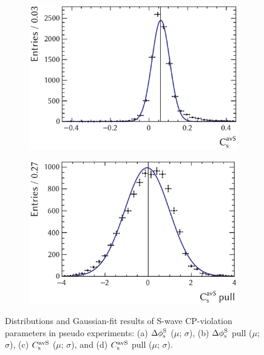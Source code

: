 \begin{figure}[tb]
  \vspace*{0.02\textwidth}
  \begin{subfigure}{0.49\textwidth}
    \includegraphics[width=\textwidth]{graphics/results/parDist_polarDep_CCPAv_AS}
    \caption{}
  \end{subfigure}
  \hfill%
  \begin{subfigure}{0.49\textwidth}
    \includegraphics[width=\textwidth]{graphics/results/pullDist_polarDep_CCPAv_AS}
    \caption{}
  \end{subfigure}

  \caption{Distributions and Gaussian-fit results of S-wave CP-violation parameters in pseudo experiments:
           (a) $\Delta\phi_\text{s}^{\text{S}}$ ($\mu$; $\sigma$),
           (b) $\Delta\phi_\text{s}^{\text{S}}$ pull ($\mu$; $\sigma$),
           (c) $C_\text{s}^\text{avS}$ ($\mu$; $\sigma$), and
           (d) $C_\text{s}^\text{avS}$ pull ($\mu$\texteq{}; $\sigma$).}
  \label{fig:parDists_SWave_CPV}
\end{figure}

